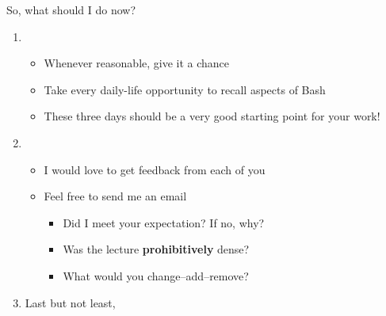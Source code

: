 \begin{frame}{So, what should I do now?}
    \vspace{-2mm}
    \begin{enumerate}
        \setlength{\itemsep}{1mm}
        \item<1-> 
                  \begin{itemize}
                    \item Whenever reasonable, give it a chance
                    \item Take every daily-life opportunity to recall aspects of Bash
                    \item These three days should be a very good starting point for your work!
                  \end{itemize}
        \item<2-> 
                  \begin{itemize}
                      \item I would love to get feedback from each of you
                      \item Feel free to send me an email \,
                            \begin{itemize}
                                \item Did I meet your expectation? If no, why?
                                \item Was the lecture \textbf{prohibitively} dense? 
                                \item What would you change--add--remove?
                            \end{itemize}
                  \end{itemize}
        \item<3-> Last but not least,  $\;$
    \end{enumerate}
\end{frame}